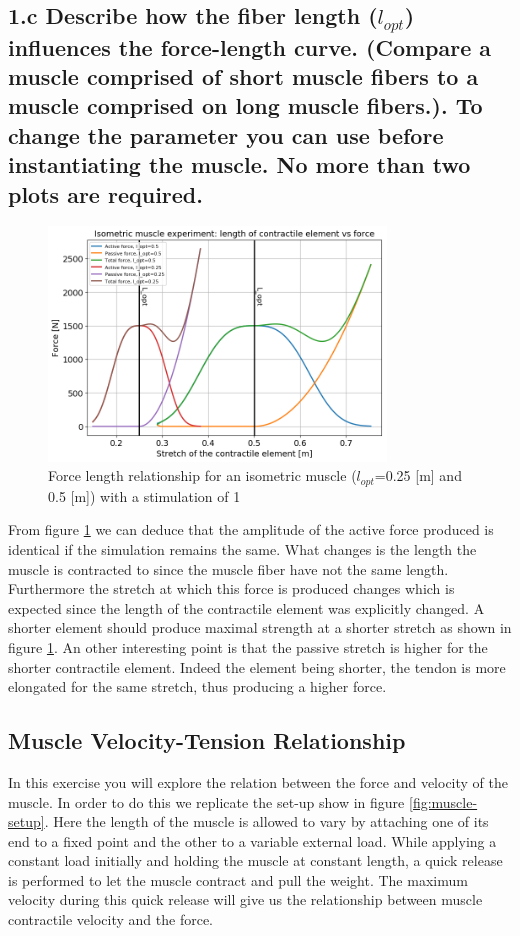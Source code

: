 \documentclass{cmc}
\begin{document}
\subsection*{1.c Describe how the fiber length ($l_{opt}$) influences
  the force-length curve.  (Compare a muscle comprised of short muscle
  fibers to a muscle comprised on long muscle fibers.). To change the
  parameter you can use
   before
  instantiating the muscle. No more than two plots are required. }

\begin{figure}[H]
\centering
    \includegraphics[width=0.8\textwidth]{figures/1_c_lce_iso_merged.png}
    \caption{Force length relationship for an isometric muscle ($l_{opt}$=0.25 [m] and 0.5 [m]) with a stimulation of 1}
    \label{fig:Exercise1c}
\end{figure}

From figure \ref{fig:Exercise1c} we can deduce that the amplitude of the active force produced is identical if the simulation remains the same. What changes is the length the muscle is contracted to since the muscle fiber have not the same length. Furthermore the stretch at which this force is produced changes which is expected since the length of the contractile element was explicitly changed. A shorter element should produce maximal strength at a shorter stretch as shown in figure \ref{fig:Exercise1c}. An other interesting point is that the passive stretch is higher for the shorter contractile element. Indeed the element being shorter, the tendon is more elongated for the same stretch, thus producing a higher force. 

\vfill
\clearpage

\subsection*{Muscle Velocity-Tension Relationship}
In this exercise you will explore the relation between the force and
velocity of the muscle. In order to do this we replicate the set-up
show in figure \ref{fig:muscle-setup}. Here the length of the muscle
is allowed to vary by attaching one of its end to a fixed point and
the other to a variable external load. While applying a constant load
initially and holding the muscle at constant length, a quick release
is performed to let the muscle contract and pull the weight. The
maximum velocity during this quick release will give us the
relationship between muscle contractile velocity and the force.
\end{document}
